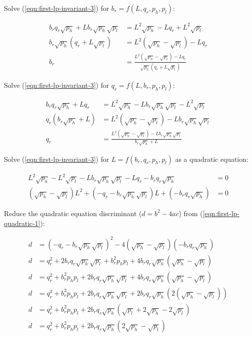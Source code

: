 \documentclass[table, twocolumn]{article}
\begin{document}
Solve (\ref{eqn:first-lp-invariant-3}) for $b_r = f(L, q_r, p_h, p_l)$:

\begin{align} \label{eqn:first-lp-br-from-l-qr}
  b_r q_r \sqrt{p_h} + L b_r \sqrt{p_h} \sqrt{p_l} & =
  L^2 \sqrt{p_h} - L q_r + L^2 \sqrt{p_l} \nonumber    \\
  b_r \sqrt{p_h} (q_r + L \sqrt{p_l})              & =
  L^2 (\sqrt{p_h} - \sqrt{p_l}) - L q_r \nonumber      \\
  b_r                                              & =
  \frac{L^2 (\sqrt{p_h} - \sqrt{p_l}) - L q_r}{\sqrt{p_h}(q_r + L \sqrt{p_l})}
\end{align}

Solve (\ref{eqn:first-lp-invariant-3}) for $q_r = f(L, b_r, p_h, p_l)$:

\begin{align} \label{eqn:first-lp-qr-from-l-br}
  b_r q_r \sqrt{p_h} + L q_r & =
  L^2 \sqrt{p_h} - L b_r \sqrt{p_h} \sqrt{p_l} - L^2 \sqrt{p_l} \nonumber \\
  q_r (b_r \sqrt{p_h} + L)   & =
  L^2 (\sqrt{p_h} - \sqrt{p_l}) - L b_r \sqrt{p_h} \sqrt{p_l} \nonumber   \\
  q_r                        & =
  \frac{L^2 (\sqrt{p_h} - \sqrt{p_l}) - L b_r \sqrt{p_h} \sqrt{p_l}}
  {b_r \sqrt{p_h} + L}
\end{align}

Solve (\ref{eqn:first-lp-invariant-3}) for $L = f(b_r, q_r, p_h, p_l)$ as a quadratic
equation:

\begin{align} \label{eqn:first-lp-quadratic-1}
  L^2 \sqrt{p_h} - L^2 \sqrt{p_l} - L b_r \sqrt{p_h} \sqrt{p_l} - L q_r
  - b_r q_r \sqrt{p_h}  & = 0 \nonumber \\
  (\sqrt{p_h} - \sqrt{p_l}) L^2 + (-q_r -b_r \sqrt{p_h} \sqrt{p_l}) L +
  (-b_r q_r \sqrt{p_h}) & = 0
\end{align}

Reduce the quadratic equation discriminant ($d = b^2 - 4ac$) from
(\ref{eqn:first-lp-quadratic-1}):

\begin{align} \label{eqn:first-lp-quadratic-2}
  d & = (-q_r - b_r \sqrt{p_h} \sqrt{p_l})^2
  - 4(\sqrt{p_h} - \sqrt{p_l})(-b_r q_r \sqrt{p_h}) \nonumber    \\
  d & = q_r^2 + 2 b_r q_r \sqrt{p_h} \sqrt{p_l} + b_r^2 p_h p_l
  + 4 b_r q_r \sqrt{p_h} (\sqrt{p_h} - \sqrt{p_l}) \nonumber     \\
  d & = q_r^2 + b_r^2 p_h p_l + 2 b_r q_r \sqrt{p_h} \sqrt{p_l}
  + 4 b_r q_r \sqrt{p_h} (\sqrt{p_h} - \sqrt{p_l}) \nonumber     \\
  d & = q_r^2 + b_r^2 p_h p_l + 2 b_r q_r \sqrt{p_h} \sqrt{p_l}
  + 2 b_r q_r \sqrt{p_h} (2 (\sqrt{p_h} - \sqrt{p_l})) \nonumber \\
  d & = q_r^2 + b_r^2 p_h p_l + 2 b_r q_r \sqrt{p_h}
  (\sqrt{p_l} + 2 \sqrt{p_h} - 2 \sqrt{p_l}) \nonumber           \\
  d & = q_r^2 + b_r^2 p_h p_l + 2 b_r q_r \sqrt{p_h}
  (2 \sqrt{p_h} - \sqrt{p_l}) \nonumber                          \\
\end{align}
\end{document}
